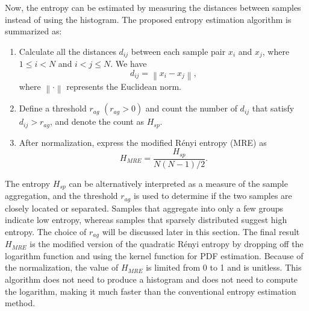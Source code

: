 \documentclass[journal,comsoc, onecolumn, 12pt,draftclsnofoot]{IEEEtran} %
\begin{document}
Now, the entropy can be estimated by  measuring the distances between samples instead of using the histogram.
The proposed entropy estimation algorithm is summarized as:
\begin{enumerate}
\item Calculate all the distances \(d_{ij}\) between each sample pair \(x_i\) and \(x_j\), where \(1\le i<N\) and \( i<j \le N\). We have
 \begin{equation}
d_{ij}=\left\|x_i-x_j \right\|,
\label{eq:distance}
\end{equation}
where \(\left\| \cdot \right\|\) represents the Euclidean norm.
\item Define a threshold \(r_{ag}\) \((r_{ag}>0)\) and count the number of \(d_{ij}\) that satisfy $d_{ij}>r_{ag}$, and denote the count as $H_{sp}$.
\item After normalization, express the modified R\'enyi entropy (MRE) as
\begin{equation}
H_{MRE}= \frac{ H_{sp}}{ N(N-1)/2}.
\label{eq:entorpy_ad}
\end{equation}
\end{enumerate}


The entropy \(H_{sp}\) can be alternatively interpreted as a measure of the sample aggregation,
and the threshold \(r_{ag}\) is used to determine if the two samples are closely located or separated.
Samples that aggregate into only a few groups indicate low entropy, whereas samples that sparsely distributed suggest high entropy.
The choice of \(r_{ag}\) will be discussed later in this section.
The final result \(H_{MRE}\) is the modified version of the quadratic R\'enyi entropy  by dropping off the logarithm function and using the kernel function for PDF estimation.
Because of the normalization, the value of $H_{MRE}$ is limited from 0 to 1 and is unitless.
This algorithm does not need to produce a histogram and does not need to compute the logarithm, making it much faster than the conventional entropy estimation method.

\end{document}
